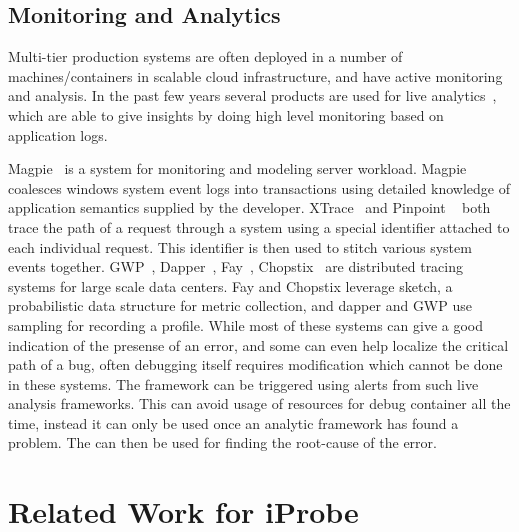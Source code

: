 \subsection{Monitoring and Analytics}

Multi-tier production systems are often deployed in a number of machines/containers in scalable cloud infrastructure, and have active monitoring and analysis.
In the past few years several products are used for live analytics~\cite{nagios,magpie,vpath}, which are able to give insights by doing high level monitoring based on application logs.

Magpie~\cite{magpie} is a system for monitoring and modeling server workload.
Magpie coalesces windows system event logs into transactions using detailed knowledge of application semantics supplied by the developer. 
XTrace~\cite{xtrace} and Pinpoint ~\cite{pinpoint} both trace the path of a request through a system using a special identifier attached to each individual request. 
This identifier is then used to stitch various system events together.
GWP~\cite{gwp}, Dapper~\cite{dapper}, Fay~\cite{fay}, Chopstix~\cite{chopstix} are distributed tracing systems for large scale data centers.
Fay and Chopstix leverage sketch, a probabilistic data structure for metric collection, and dapper and GWP use sampling for recording a profile.
While most of these systems can give a good indication of the presense of an error, and some can even help localize the critical path of a bug, often debugging itself requires modification which cannot be done in these systems.
The \parikshan framework can be triggered using alerts from such live analysis frameworks.
This can avoid usage of resources for debug container all the time, instead it can only be used once an analytic framework has found a problem. 
The \debugcontainer can then be used for finding the root-cause of the error.

\section{Related Work for iProbe}


